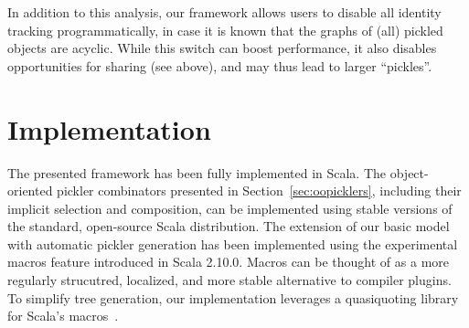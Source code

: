 \documentclass[10pt]{sigplanconf}
\theoremstyle{definition}
\theoremstyle{definition}
\newcommand{\todo}{{\bf \colorbox{red}{\color{white}TODO:}}}
\begin{document}
In addition to this analysis, our framework allows users to disable all
identity tracking programmatically, in case it is known that the graphs of
(all) pickled objects are acyclic. While this switch can boost performance, it
also disables opportunities for sharing (see above), and may thus lead to
larger ``pickles''.



\section{Implementation}

The presented framework has been fully implemented in Scala.
The object-oriented pickler combinators presented in
Section~\ref{sec:oopicklers}, including their implicit selection and
composition, can be implemented using stable versions of the standard, open-source
Scala distribution. The extension of our basic model with
automatic pickler generation has been implemented using the experimental
macros feature introduced in Scala 2.10.0. Macros can be thought of as a
more regularly strucutred, localized, and more stable alternative to compiler
plugins. To simplify tree generation, our implementation leverages a
quasiquoting library for Scala's macros~\cite{Quasiquotes}.









\end{document}

